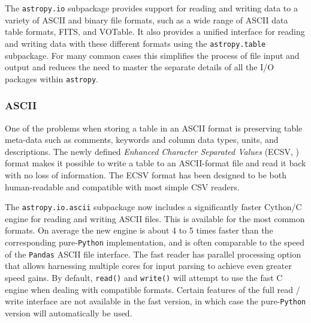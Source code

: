 \documentclass[modern]{aastex61}
\newcommand{\package}[1]{\texttt{#1}\xspace}
\newcommand{\python}{\package{Python}}
\newcommand{\astropypkg}{\package{astropy}}
\newcommand{\inlinecomment}[2]{\todo[inline]{#1: #2}\xspace}
\begin{document}
The \package{astropy.io} subpackage provides support for reading and writing
data to a variety of ASCII and binary file formats, such as a wide range of
ASCII data table formats, FITS, and VOTable.
It also provides a unified interface for reading and writing data with these
different formats using the \package{astropy.table} subpackage.
For many common cases this simplifies the process of file input and output and
reduces the need to master the separate details of all the I/O packages within
\astropypkg.






\subsubsection{ASCII}

One of the problems when storing a table in an ASCII format is
preserving table meta-data such as comments, keywords and column data
types, units, and descriptions. The newly defined \emph{Enhanced
Character Separated Values} (ECSV,  \citet{ape6}) format makes it
possible to write a table to an ASCII-format file and read it back
with no loss of information. The ECSV format has been designed to be
both human-readable and compatible with most simple CSV readers.


The \package{astropy.io.ascii} subpackage now includes a significantly faster
Cython/C engine for reading and writing ASCII files. This is available for the
most common formats.  On average the new engine is about 4 to 5 times faster
than the corresponding pure-\python implementation, and is often comparable to
the speed of the \package{Pandas} \citep{pandas} ASCII file interface.  The
fast reader has parallel processing option that allows harnessing multiple
cores for input parsing to achieve even greater speed gains.  By default,
\texttt{read()} and \texttt{write()} will attempt to use the fast C engine
when dealing with compatible formats. Certain features of the full read
/ write interface are not available in the fast version, in which case the
pure-\python version will automatically be used.
\end{document}
